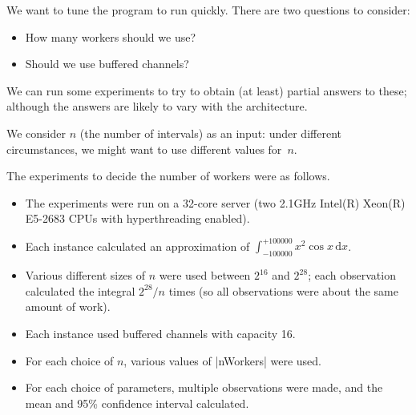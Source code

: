 \begin{slide}

We want to tune the program to run quickly.  There are two questions to
consider: 
%
\begin{itemize}
\item How many workers should we use?

\item Should we use buffered channels?
\end{itemize}
%
We can run some experiments to try to obtain (at least) partial answers to
these; although the answers are likely to vary with the architecture.

We consider $n$ (the number of intervals) as an input: under different
circumstances, we might want to use different values for~$n$.



\end{slide}


\begin{slide}

The experiments to decide the number of workers were as follows.
%
\begin{itemize}
\item The experiments were run on a 32-core server (two 2.1GHz Intel(R)
Xeon(R) E5-2683 CPUs with hyperthreading enabled).

\item 
Each instance calculated an approximation of $\int_{-100000}^{+100000} x^2
\cos x \, \mbox{d}x$.

\item
Various different sizes of $n$ were used between $2^{16}$ and $2^{28}$; each
observation calculated the integral $2^{28}/n$ times (so all observations were
about the same amount of work).

\item
Each instance used buffered channels with capacity 16.

\item
For each choice of $n$, various values of |nWorkers| were used.

\item
For each choice of parameters, multiple observations were made, and the mean
and 95\% confidence interval calculated.
\end{itemize}
\end{slide}

